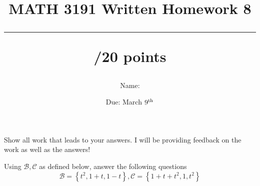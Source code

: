 \documentclass{exam}
\title{MATH 3191 Written Homework 8\\\rule{30pt}{1pt}/20 points}
\author{Name: \rule{150pt}{1pt}}
\date{Due: March $9^\textnormal{th}$}
\renewcommand{\B}{\mathcal{B}}
\renewcommand{\C}{\mathcal{C}}
\newcommand{\setBasic}[1]{\left\{#1\right\}}
\begin{document}
\maketitle
Show all work that leads to your answers. I will be providing feedback on the work as well as the answers!
\begin{questions}
    \question Using $\B,\C$ as defined below, answer the following questions
    \[
        \B = \setBasic{t^2, 1+t, 1-t}, \C = \setBasic{1+t+t^2, 1, t^2}
    \]
\end{questions}
\end{document}
